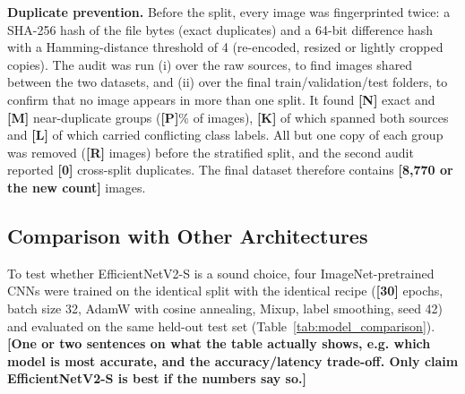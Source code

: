 \newcommand{\todo}[1]{{\color{red}\textbf{[#1]}}}


\textbf{Duplicate prevention.} Before the split, every image was fingerprinted twice: a SHA-256
hash of the file bytes (exact duplicates) and a 64-bit difference hash with a Hamming-distance
threshold of 4 (re-encoded, resized or lightly cropped copies). The audit was run (i) over the raw
sources, to find images shared between the two datasets, and (ii) over the final train/validation/test
folders, to confirm that no image appears in more than one split. It found \todo{N} exact and
\todo{M} near-duplicate groups (\todo{P}\% of images), \todo{K} of which spanned both sources and
\todo{L} of which carried conflicting class labels. All but one copy of each group was removed
(\todo{R} images) before the stratified split, and the second audit reported \todo{0} cross-split
duplicates. The final dataset therefore contains \todo{8,770 or the new count} images.

\subsection{Comparison with Other Architectures}
To test whether EfficientNetV2-S is a sound choice, four ImageNet-pretrained CNNs were trained on the
identical split with the identical recipe (\todo{30} epochs, batch size 32, AdamW with cosine
annealing, Mixup, label smoothing, seed 42) and evaluated on the same held-out test set
(Table~\ref{tab:model_comparison}). \todo{One or two sentences on what the table actually shows, e.g.
which model is most accurate, and the accuracy/latency trade-off. Only claim EfficientNetV2-S is best
if the numbers say so.}

